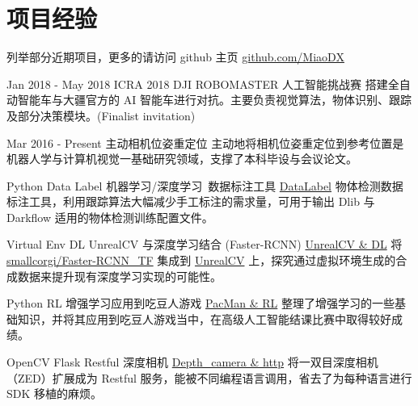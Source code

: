 \documentclass[utf8]{twentysecondcv} %
\begin{document}
\section{项目经验}
\begin{twenty}

    \twentyitem
        {}
        {}        
        {列举部分近期项目，更多的请访问 github 主页}
        {\href{https://github.com/MiaoDX/}{github.com/MiaoDX}}
        {}
        {}
          
    \twentyitem
    {Jan 2018 - }
    {May 2018}
    {ICRA 2018 DJI ROBOMASTER 人工智能挑战赛}
    {}
    {}
    {搭建全自动智能车与大疆官方的 AI 智能车进行对抗。主要负责视觉算法，物体识别、跟踪及部分决策模块。(Finalist invitation)}
    
    \twentyitem
    {Mar 2016 -}
    {Present}
    {主动相机位姿重定位}
    {}
    {}
	{主动地将相机位姿重定位到参考位置是机器人学与计算机视觉一基础研究领域，支撑了本科毕设与会议论文。}
    
	\twentyitem
        {Python}
		{Data Label}
        {机器学习/深度学习\ 数据标注工具}
        {\href{https://github.com/MiaoDX/DataLabel}{DataLabel}}
        {}
        {物体检测数据标注工具，利用跟踪算法大幅减少手工标注的需求量，可用于输出 Dlib 与 Darkflow 适用的物体检测训练配置文件。}
          
    \twentyitem
        {Virtual Env}
      	{DL}
        {UnrealCV 与深度学习结合 (Faster-RCNN)}
        {\href{https://github.com/MiaoDX/unrealcv_examples/}{UnrealCV \& DL}}
        {}
        {将 \href{https://github.com/smallcorgi/Faster-RCNN\_TF}{smallcorgi/Faster-RCNN\_TF} 集成到 \href{https://github.com/unrealcv/unrealcv}{UnrealCV} 上，探究通过虚拟环境生成的合成数据来提升现有深度学习实现的可能性。}
                 
    \twentyitem
        {Python}
		{RL}
        {增强学习应用到吃豆人游戏}
        {\href{https://github.com/MiaoDX/hand_in_homework/tree/master/Advanced\_AI/}{PacMan \& RL}}
        {}
        {整理了增强学习的一些基础知识，并将其应用到吃豆人游戏当中，在高级人工智能结课比赛中取得较好成绩。}
        
		\twentyitem
        {OpenCV}
        {Flask}
        {Restful 深度相机}
        {\href{https://github.com/MiaoDX/depth\_camera}{Depth\_camera \& http}}
        {}
        {将一双目深度相机（ZED）扩展成为 Restful 服务，能被不同编程语言调用，省去了为每种语言进行 SDK 移植的麻烦。}


\end{twenty}
\end{document}
